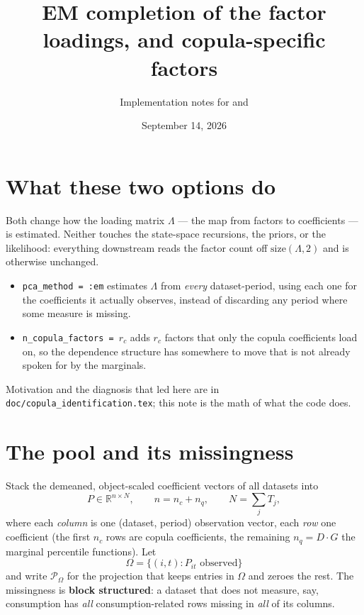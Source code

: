 \documentclass[11pt]{article}
\title{EM completion of the factor loadings, and copula-specific factors}
\author{Implementation notes for \code{pca\_method = :em} and \code{n\_copula\_factors}}
\date{September 14, 2026}
\newcommand{\code}[1]{\texttt{#1}}
\begin{document}
\maketitle

\section{What these two options do}

Both change how the loading matrix $\Lambda$ --- the map from factors to
coefficients --- is estimated. Neither touches the state-space recursions, the
priors, or the likelihood: everything downstream reads the factor count off
$\mathrm{size}(\Lambda, 2)$ and is otherwise unchanged.

\begin{itemize}[leftmargin=*]
  \item \code{pca\_method = :em} estimates $\Lambda$ from \emph{every}
        dataset-period, using each one for the coefficients it actually
        observes, instead of discarding any period where some measure is
        missing.
  \item \code{n\_copula\_factors = $r_c$} adds $r_c$ factors that only the
        copula coefficients load on, so the dependence structure has somewhere
        to move that is not already spoken for by the marginals.
\end{itemize}

Motivation and the diagnosis that led here are in
\code{doc/copula\_identification.tex}; this note is the math of what the code
does.

\section{The pool and its missingness}

Stack the demeaned, object-scaled coefficient vectors of all datasets into
\begin{equation}
  P \in \mathbb{R}^{n \times N},
  \qquad
  n = n_c + n_q, \qquad N = \sum_j T_j ,
\end{equation}
where each \emph{column} is one (dataset, period) observation vector, each
\emph{row} one coefficient (the first $n_c$ rows are copula coefficients, the
remaining $n_q = D\cdot G$ the marginal percentile functions). Let
\begin{equation}
  \Omega = \bigl\{ (i,t) : P_{it} \text{ observed} \bigr\}
\end{equation}
and write $\mathcal{P}_\Omega$ for the projection that keeps entries in $\Omega$
and zeroes the rest. The missingness is \textbf{block structured}: a dataset
that does not measure, say, consumption has \emph{all} consumption-related rows
missing in \emph{all} of its columns.
\end{document}
